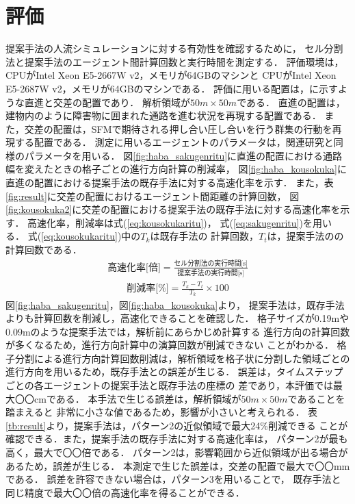 \documentclass{maelab_y}
\newcommand{\分類条件}{%
\begin{table}[t]
\begin{center}
\caption{進行方向を分類する条件}
\ecaption{Classification condition of moving direction $e_{i}$.}
\label{tb:hantei_jouken}
\begin{tabular}{c|c|c|c|c}
\hline \hline
			& 右 & 左 & 上 & 下 \\ \hline
パターン2   & $\frac{1}{\sqrt{2}} < e_x \leq 1  $
		    & $ -1 \leq e_x < \frac{-1}{\sqrt{2}}$ 
		    & $ \frac{-1}{\sqrt{2}} < e_x < \frac{1}{\sqrt{2}} $ 
		    & $ \frac{-1}{2} < e_x < \frac{1}{2} $ \\
パターン3   & $\frac{-1}{2} < e_y < \frac{1}{2} $ 
		    & $\frac{-1}{2} < e_y < \frac{1}{2} $
            & $ \frac{1}{\sqrt{2}} < e_y \leq 1$
		    & $ -1 \leq e_y < \frac{-1}{\sqrt{2}} $ \\
\hline
\multirow{2}{*}{パターン4}   
			& $R_x \geq A_x$ & $R_x < A_x$ & $R_y \geq A_y$ & $R_y < A_y $ \\
	        &  $L_x \geq A_x$ & $L_x < A_x$ & $L_y \geq A_y$ & $L_y < A_y$ \\
\hline
\multirow{2}{*}{パターン5}   
 			& $R_x \geq x_1$ & $R_x < x_2$ & $R_y \geq y_1$ & $R_y < y_2 $ \\
			& $L_x \geq x_1$ & $L_x < x_2$ & $L_y \geq y_1$ & $L_y < y_2 $ \\
\hline
パターン6   & $ \cos(\frac{1}{2}\theta_{view}) \leq  e_y $ 
			& $ e_y \leq -\cos(\frac{1}{2}\theta_{view})$ 
			& $ \sin(\frac{1}{2}(\pi - \theta_{view})) \leq e_x $ 
			& $ e_x \leq \sin(\frac{1}{2}(\pi - \theta_{view}))  $ \\
\hline
\end{tabular}
\end{center}
\end{table}
}%
\newcommand{\距離計算new}{%
  \begin{table}[hbtp]
    \begin{center}
    \caption{エージェント間距離の計算回数[$10^{10}$回]}
    \label{tab:keisan_kaisu}
    \begin{tabular}{c|llllll}
    \hline \hline
    \multirow{2}{*}{人数}   & \multicolumn{6}{c}{パターン}                                                                                                                                                             \\ \cline{2-7} 
                          & \multicolumn{1}{c|}{1}    & \multicolumn{1}{c|}{2}               & \multicolumn{1}{c|}{3}      & \multicolumn{1}{c|}{4}      & \multicolumn{1}{c|}{5}      & \multicolumn{1}{c}{6}    \\ \hline
    \multirow{2}{*}{3000} & \multicolumn{1}{r|}{5.1}  & \multicolumn{1}{r|}{\textbf{3.9}}    & \multicolumn{1}{r|}{4.0}    & \multicolumn{1}{r|}{4.4}    & \multicolumn{1}{r|}{4.1}    & \multicolumn{1}{r}{4.4}  \\
                          & \multicolumn{1}{l|}{}     & \multicolumn{1}{l|}{\textbf{(24\%)}} & \multicolumn{1}{l|}{(23\%)} & \multicolumn{1}{l|}{(15\%)} & \multicolumn{1}{l|}{(21\%)} & (15\%)                   \\ \hline
    \multirow{2}{*}{5000} & \multicolumn{1}{r|}{14.4} & \multicolumn{1}{r|}{\textbf{10.9}}   & \multicolumn{1}{r|}{11.1}   & \multicolumn{1}{r|}{12.2}   & \multicolumn{1}{r|}{11.4}   & \multicolumn{1}{r}{12.2} \\
                          & \multicolumn{1}{l|}{}     & \multicolumn{1}{l|}{\textbf{(24\%)}} & \multicolumn{1}{l|}{(23\%)} & \multicolumn{1}{l|}{(15\%)} & \multicolumn{1}{l|}{(21\%)} & (15\%)                   \\ \hline
    \multirow{2}{*}{7500} & \multicolumn{1}{r|}{33.1} & \multicolumn{1}{r|}{\textbf{25.2}}   & \multicolumn{1}{r|}{25.8}   & \multicolumn{1}{r|}{28.3}   & \multicolumn{1}{r|}{26.7}   & \multicolumn{1}{r}{28.3} \\
                          & \multicolumn{1}{l|}{}     & \multicolumn{1}{l|}{\textbf{(24\%)}} & \multicolumn{1}{l|}{(22\%)} & \multicolumn{1}{l|}{(15\%)} & \multicolumn{1}{l|}{(20\%)} & (15\%)                   \\ \hline
    \end{tabular}
    \end{center}
    \end{table}
}%
\newcommand{\粒子数}{%
\begin{table}[hbtp]
  \begin{center}
    \caption{各配置の詳細}
    \label{tb:haichi_para}
    \begin{tabular}{c|c|c}
      \hline \hline
      & 教室 & 演習室 \\ \hline 
      エージェント数[人] & 96 & 204 \\ \hline
      壁粒子数[個] & 1037 & 1454\\ \hline
      経由地数[個] & 12   & 26 \\ \hline
      解析領域 & $50m\times50m$ & $50m\times50m$ \\ \hline
    \end{tabular}
  \end{center}
\end{table}
}%
\newcommand{\評価環境}{%
\begin{table}[hbtp]
  \begin{center}
    \caption{各配置の詳細}
    \label{tb:haichi_para}
    \begin{tabular}{c|c|c}
      \hline \hline
                 & マシン1                & マシン2 \\ \hline 
      CPU        & Intel Xeon E5-2687W & Intel Xeon E5-2667W \\ \hline
      メモリ     & 64GB                   & 64GB \\ \hline
      OS         & Linux 4.12.9            & Linux 6.5.8 \\ \hline
      コンパイラ & gcc 7.2.0             & gcc 13.2.0 \\ \hline
    \end{tabular}
  \end{center}
\end{table}
}%
\newcommand{\判定条件new}{%
  \begin{table}[hbtp]
    \centering
		\caption{パターンごとの進行方向分類条件}
		\label{tb:joken}
		{\scriptsize
    \begin{tabular}{Wc{0.5em}|cccWc{8em}}
    \hline \hline
                          & \multicolumn{1}{c|}{パターン2，3} & \multicolumn{1}{c|}{パターン4}   & \multicolumn{1}{c|}{パターン5}   & パターン6                   \\ \hline
    \multirow{2}{*}{右}    & \multicolumn{1}{c|}{$\frac{1}{\sqrt{2}} < e_x \leq 1$}  & \multicolumn{1}{c|}{$R_x \geq A_x$}  & \multicolumn{1}{c|}{$R_x \geq x_1$}  & \multirow{2}{*}{$ \cos(\frac{1}{2}\theta_v) \leq  e_y $} \\
                          & \multicolumn{1}{c|}{$\frac{-1}{2} < e_y < \frac{1}{2} $}   & \multicolumn{1}{l|}{$L_x \geq A_x$} & \multicolumn{1}{l|}{$L_x \geq x_1$} &                     \\ \hline
    \multirow{2}{*}{左}    & \multicolumn{1}{c|}{$ -1 \leq e_x < \frac{-1}{\sqrt{2}}$}  & \multicolumn{1}{c|}{$R_x < A_x$}  & \multicolumn{1}{c|}{$R_x < x_2$}  & \multirow{2}{*}{$ e_y \leq -\cos(\frac{1}{2}\theta_{v})$} \\
                          & \multicolumn{1}{l|}{$\frac{-1}{2} < e_y < \frac{1}{2} $}   & \multicolumn{1}{l|}{$L_x < A_x$} & \multicolumn{1}{l|}{$L_x < x_2$ } &                     \\ \hline
    \multirow{2}{*}{上}    & \multicolumn{1}{c|}{$ \frac{-1}{\sqrt{2}} < e_x < \frac{1}{\sqrt{2}}$}  & \multicolumn{1}{c|}{$R_y \geq A_y$ }  & \multicolumn{1}{c|}{$R_y \geq y_1$ }  & \multirow{2}{*}{$ \sin(\frac{1}{2}(\theta_{\pi - v})) \leq e_x$} \\
                          & \multicolumn{1}{l|}{$ \frac{1}{\sqrt{2}} < e_y \leq 1$}   & \multicolumn{1}{l|}{$L_y \geq A_y$} & \multicolumn{1}{l|}{$L_y \geq y_1$} &                     \\ \hline
    \multirow{2}{*}{下}    & \multicolumn{1}{c|}{$ \frac{-1}{2} < e_x < \frac{1}{2} $}  & \multicolumn{1}{c|}{$R_y < A_y $}  & \multicolumn{1}{c|}{$R_y < y_2 $ }  & \multirow{2}{*}{$ e_x \leq \sin(\frac{1}{2}(\theta_{\pi - v}))$} \\
                          & \multicolumn{1}{l|}{$ -1 \leq e_y < \frac{-1}{\sqrt{2}} $}   & \multicolumn{1}{l|}{$L_y < A_y$} & \multicolumn{1}{l|}{$L_y < y_2 $ } &                     \\ \hline
    \end{tabular}
		}
    \end{table}
}%
\begin{document}
\section{評価}
提案手法の人流シミュレーションに対する有効性を確認するために，
セル分割法と提案手法のエージェント間計算回数と実行時間を測定する．
評価環境は，CPUがIntel Xeon E5-2667W v2，メモリが64GBのマシンと
CPUがIntel Xeon E5-2687W v2，メモリが64GBのマシンである．
評価に用いる配置は，に示すような直進と交差の配置であり．
解析領域が$50m\times50m$である．
直進の配置は，建物内のように障害物に囲まれた通路を進む状況を再現する配置である．
また，交差の配置は，SFMで期待される押し合い圧し合いを行う群集の行動を再現する配置である．
測定に用いるエージェントのパラメータは，関連研究\cite{helbing_sfm}と同様のパラメータを用いる．
図\ref{fig:haba_sakugenritu}に直進の配置における通路幅を変えたときの格子ごとの進行方向計算の削減率，
図\ref{fig:haba_kousokuka}に直進の配置における提案手法の既存手法に対する高速化率を示す．
また，表\ref{fig:result}に交差の配置におけるエージェント間距離の計算回数，
図\ref{fig:kousokuka2}に交差の配置における提案手法の既存手法に対する高速化率を示す．
%
高速化率，削減率は式(\ref{eq:kousokukaritu})，
式(\ref{eq:sakugenritu})を用いる．
式(\ref{eq:kousokukaritu})中の$T_{k}$は既存手法の
計算回数，$T_{t}$は，提案手法のの計算回数である．
%
\begin{eqnarray}
  \label{eq:kousokukaritu}
  \mbox{高速化率[倍]} =
  \frac{\mbox{セル分割法の実行時間[s]}}{\mbox{提案手法の実行時間[s]}}
\end{eqnarray}
%
\begin{eqnarray}
  \label{eq:sakugenritu}
  \mbox{削減率[\%]} =
  \frac{T_{k} - T_{t}}{T_{k}} \times 100
\end{eqnarray}\vspace{1mm}
%
図\ref{fig:haba_sakugenritu}，図\ref{fig:haba_kousokuka}より，
提案手法は，既存手法よりも計算回数を削減し，高速化できることを確認した．
格子サイズが0.19mや0.09mのような提案手法では，解析前にあらかじめ計算する
進行方向の計算回数が多くなるため，進行方向計算中の演算回数が削減できない
ことがわかる．
格子分割による進行方向計算回数削減は，解析領域を格子状に分割した領域ごとの
進行方向を用いるため，既存手法との誤差が生じる．
誤差は，タイムステップごとの各エージェントの提案手法と既存手法の座標の
差であり，本評価では最大〇〇cmである．
本手法で生じる誤差は，解析領域が$50m\times50m$であることを踏まえると
非常に小さな値であるため，影響が小さいと考えられる．
表\ref{tb:result}より，提案手法は，パターン2の近似領域で最大24\%削減できる
ことが確認できる．また，提案手法の既存手法に対する高速化率は，
パターン2が最も高く，最大で〇〇倍である．
パターン2は，影響範囲から近似領域が出る場合があるため，誤差が生じる．
本測定で生じた誤差は，交差の配置で最大で〇〇mmである．
誤差を許容できない場合は，パターン3を用いることで，
既存手法と同じ精度で最大〇〇倍の高速化率を得ることができる．
\end{document}
